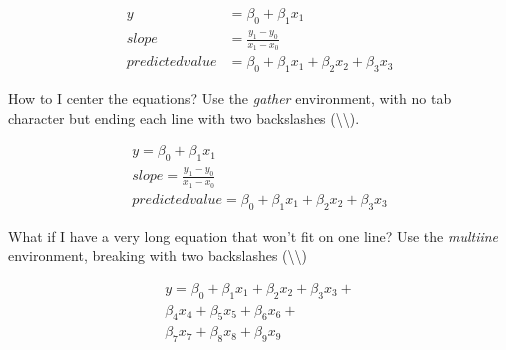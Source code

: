         \begin{sample}
		\begin{align}
			y& = \beta_0 + \beta_1 x_1\\
			slope& = \frac{y_1 - y_0}{x_1 - x_0}\\
			predictedvalue& = \beta_0 + \beta_1 x_1 + \beta_2 x_2 + \beta_3 x_3
		\end{align}
        \end{sample}

		How to I center the equations? Use the \textit{gather} environment, with no tab character but ending each line with two backslashes (\textbackslash{}\textbackslash{}).

        \begin{sample}
		\begin{gather}
			y = \beta_0 + \beta_1 x_1\\
			slope = \frac{y_1 - y_0}{x_1 - x_0}\\
			predictedvalue = \beta_0 + \beta_1 x_1 + \beta_2 x_2 + \beta_3 x_3
		\end{gather}
        \end{sample}

		What if I have a very long equation that won't fit on one line? Use the \textit{multiine} environment, breaking with two backslashes (\textbackslash{}\textbackslash{})

        \begin{sample}
		\begin{multline}
			y = \beta_0 + \beta_1 x_1 + \beta_2 x_2 + \beta_3 x_3 +\\
			\beta_4 x_4 + \beta_5 x_5 + \beta_6 x_6 +\\
			\beta_7 x_7 + \beta_8 x_8 + \beta_9 x_9
		\end{multline}
        \end{sample}
		
